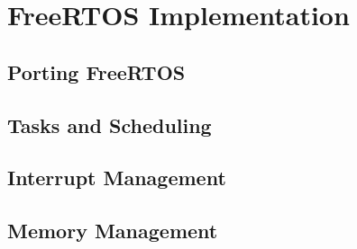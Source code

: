 \chapter{FreeRTOS Implementation}
\label{cha:rtos}

\section{Porting FreeRTOS}
\label{sec:rtos_porting}

\section{Tasks and Scheduling}
\label{sec:rtos_task}

\section{Interrupt Management}
\label{sec:rtos_interrupts}

\section{Memory Management}
\label{sec:rtos_memory}
